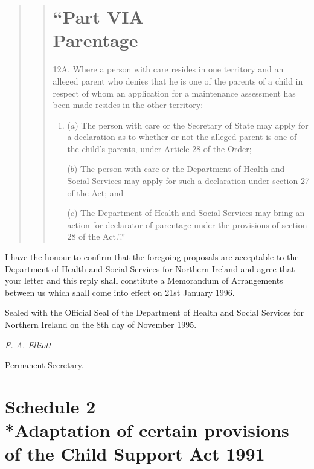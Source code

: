 \documentclass[a4paper]{article}
\begin{document}
\begin{quotation}
\begin{quotation}
 \part*{“Part VIA\\Parentage}

12A.  Where a person with care resides in one territory and an alleged parent who denies that he is one of the parents of a child in respect of whom an application for a maintenance assessment has been made resides in the other territory:—
\begin{enumerate}\item[]
\begin{sloppypar}
($a$) The person with care or the Secretary of State may apply for a declaration as to whether or not the alleged parent is one of the child’s parents, under Article 28 of the Order;
\end{sloppypar}

($b$) The person with care or the Department of Health and Social Services may apply for such a declaration under section 27 of the Act; and

($c$) The Department of Health and Social Services may bring an action for declarator of parentage under the provisions of section 28 of the Act.”.”
\end{enumerate}
\end{quotation}
\end{quotation}

  I have the honour to confirm that the foregoing proposals are acceptable to the Department of Health and Social Services for Northern Ireland and agree that your letter and this reply shall constitute a Memorandum of Arrangements between us which shall come into effect on 21st January 1996.

  Sealed with the Official Seal of the Department of Health and Social Services for Northern Ireland on the 8th day of November 1995.

  \emph{F. A. Elliott}

  Permanent Secretary.

\part[Schedule 2 --- Adaptation of certain provisions of the Child Support Act 1991]{Schedule 2\\*Adaptation of certain provisions of the Child Support Act 1991}
\end{document}
